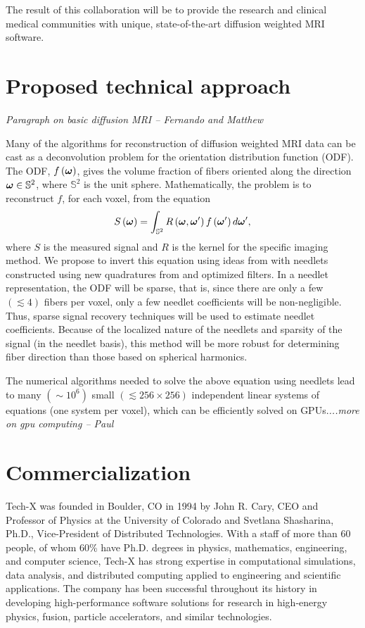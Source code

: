 \documentclass[10pt]{article}
\begin{document}
The result of this collaboration will be to provide the research and clinical
medical communities with unique, state-of-the-art diffusion weighted MRI
software.

\section*{Proposed technical approach}
\emph{Paragraph on basic diffusion MRI -- Fernando and Matthew}

Many of the algorithms for reconstruction of diffusion weighted MRI data can be
cast as a deconvolution problem for the orientation distribution function
(ODF)\cite{JIA-VEM-2007}. The ODF, $f\left({\boldsymbol{\omega}}\right)$, gives the volume
fraction of fibers oriented along the direction ${\boldsymbol{\omega}}\in\mathbb{S}^2$, where
$\mathbb{S}^2$ is the unit sphere. Mathematically, the problem is to
reconstruct $f$, for each voxel, from the equation
\begin{equation*}
  S\left({\boldsymbol{\omega}}\right) = \int_{\mathbb{S}^2} R\left({\boldsymbol{\omega}},{\boldsymbol{\omega}}'\right)
  f\left({\boldsymbol{\omega}}'\right)d{\boldsymbol{\omega}}', 
\end{equation*}  
where $S$ is the measured signal and $R$ is the kernel for the specific imaging
method. We propose to invert this equation using ideas from
\cite{KE-NG-PI-2009} with needlets constructed using new quadratures from
\cite{AHR-BEY-2009} and optimized filters. In a needlet representation, the ODF
will be sparse, that is, since there are only a few $(\lesssim 4)$ fibers per
voxel, only a few needlet coefficients will be non-negligible. Thus, sparse
signal recovery techniques will be used to estimate needlet
coefficients. Because of the localized nature of the needlets and sparsity of
the signal (in the needlet basis), this method will be more robust for
determining fiber direction than those based on spherical harmonics.

The numerical algorithms needed to solve the above equation using needlets lead to many $(\sim 10^6)$ small $(\lesssim 256\times256)$ independent linear systems of equations (one system per voxel), which can be efficiently solved on GPUs.\emph{...more on gpu computing -- Paul}

\section*{Commercialization}
Tech-X was founded in Boulder, CO in 1994 by John R. Cary, CEO and Professor of Physics at the University of Colorado and Svetlana Shasharina, Ph.D., Vice-President of Distributed Technologies. With a staff of more than 60 people, of whom 60\% have Ph.D. degrees in physics, mathematics, engineering, and computer science, Tech-X has strong expertise in computational simulations, data analysis, and distributed computing applied to engineering and scientific applications.  The company has been successful throughout its history in developing high-performance software solutions for research in high-energy physics, fusion, particle accelerators, and similar technologies.
\end{document}
